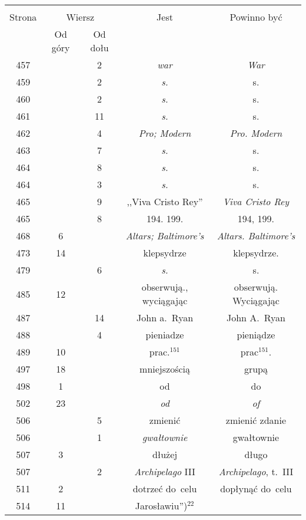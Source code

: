 \documentclass[a4paper,11pt]{article}
\begin{document}
\begin{center}
  \begin{tabular}{|c|c|c|c|c|}
    \hline
    & \multicolumn{2}{c|}{} & & \\
    Strona & \multicolumn{2}{c|}{Wiersz} & Jest
                              & Powinno być \\ \cline{2-3}
    & Od góry & Od dołu & & \\
    \hline
    457 & &  2 & \emph{war} & \emph{War} \\
    459 & &  2 & \emph{s.} & s. \\
    460 & &  2 & \emph{s.} & s. \\
    461 & & 11 & \emph{s.} & s. \\
    462 & &  4 & \emph{Pro; Modern} & \emph{Pro. Modern} \\
    463 & &  7 & \emph{s.} & s. \\
    464 & &  8 & \emph{s.} & s. \\
    464 & &  3 & \emph{s.} & s. \\
    465 & &  9 & ,,Viva Cristo Rey'' & \emph{Viva Cristo Rey} \\
    465 & &  8 & 194. 199. & 194, 199. \\
    468 &  6 & & \emph{Altars; Baltimore's} & \emph{Altars. Baltimore's} \\
    473 & 14 & & klepsydrze & klepsydrze. \\
    479 & &  6 & \emph{s.} & s. \\
    485 & 12 & & obserwują., wyciągając & obserwują. Wyciągając \\
    487 & & 14 & John a.~Ryan & John A.~Ryan \\
    488 & &  4 & pieniadze & pieniądze \\
    489 & 10 & & prac.$^{151}$ & prac$^{151}$. \\
    497 & 18 & & mniejszością & grupą \\
    498 &  1 & & od & do \\
    502 & 23 & & \emph{od} & \emph{of} \\
    506 & &  5 & zmienić & zmienić zdanie \\
    506 & &  1 & \emph{gwałtownie} & gwałtownie \\
    507 &  3 & & dłużej & długo \\
    507 & &  2 & \emph{Archipelago} III & \emph{Archipelago}, t.~III \\
    511 &  2 & & dotrzeć do~celu & dopłynąć do~celu \\
    514 & 11 & & %
                 Jarosławiu'')$^{ 22 }$  %

\end{tabular}
\end{center}
\end{document}
